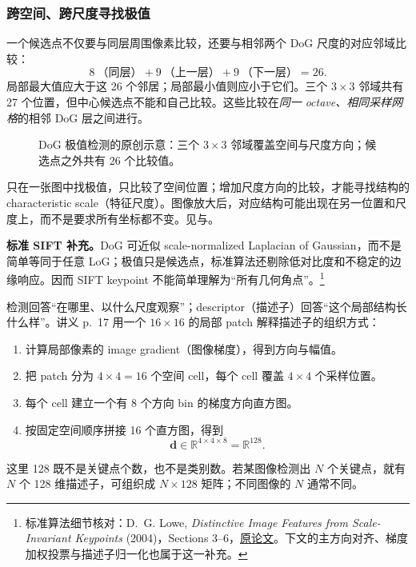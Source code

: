 \subsubsection*{跨空间、跨尺度寻找极值}

一个候选点不仅要与同层周围像素比较，还要与相邻两个 DoG 尺度的对应邻域比较：
\[
  \boxed{8\ \text{（同层）}+9\ \text{（上一层）}+9\ \text{（下一层）}=26}.
\]
局部最大值应大于这 26 个邻居；局部最小值则应小于它们。三个 $3\times3$ 邻域共有 27 个位置，但中心候选点不能和自己比较。这些比较在\emph{同一 octave、相同采样网格}的相邻 DoG 层之间进行。

\begin{figure}[htbp]
  \centering
  
  \caption{DoG 极值检测的原创示意：三个 $3\times3$ 邻域覆盖空间与尺度方向；候选点之外共有 26 个比较值。}
  \label{fig:sc4061-l09-dog}
\end{figure}

只在一张图中找极值，只比较了空间位置；增加尺度方向的比较，才能寻找结构的 characteristic scale（特征尺度）。图像放大后，对应结构可能出现在另一位置和尺度上，而不是要求所有坐标都不变。见与。

\textbf{标准 SIFT 补充。}DoG 可近似 scale-normalized Laplacian of Gaussian，而不是简单等同于任意 LoG；极值只是候选点，标准算法还剔除低对比度和不稳定的边缘响应。因而 SIFT keypoint 不能简单理解为“所有几何角点”。\footnote{标准算法细节核对：D.~G. Lowe, \emph{Distinctive Image Features from Scale-Invariant Keypoints} (2004)，Sections 3--6，\href{https://www.cs.ubc.ca/~lowe/papers/ijcv04.pdf}{原论文}。下文的主方向对齐、梯度加权投票与描述子归一化也属于这一补充。}


检测回答“在哪里、以什么尺度观察”；descriptor（描述子）回答“这个局部结构长什么样”。讲义 p.~17 用一个 $16\times16$ 的局部 patch 解释描述子的组织方式：
\begin{enumerate}
  \item 计算局部像素的 image gradient（图像梯度），得到方向与幅值。
  \item 把 patch 分为 $4\times4=16$ 个空间 cell，每个 cell 覆盖 $4\times4$ 个采样位置。
  \item 每个 cell 建立一个有 8 个方向 bin 的梯度方向直方图。
  \item 按固定空间顺序拼接 16 个直方图，得到
  \[
    \boxed{\bm d\in\mathbb R^{4\times4\times8}=\mathbb R^{128}}.
  \]
\end{enumerate}
这里 128 既不是关键点个数，也不是类别数。若某图像检测出 $N$ 个关键点，就有 $N$ 个 128 维描述子，可组织成 $N\times128$ 矩阵；不同图像的 $N$ 通常不同。

